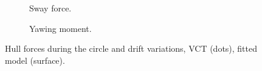 \begin{figure}[h]
     \centering
     \begin{subfigure}[b]{0.49\textwidth}
         \centering
         
        \caption{Sway force.}
        \label{fig:circle_drift_Y_H_optiwise}
     \end{subfigure}
     \hfill
     \begin{subfigure}[b]{0.49\textwidth}
         \centering
         
        \caption{Yawing moment.}
        \label{fig:circle_drift_N_H_optiwise}
     \end{subfigure}
    \caption{Hull forces during the circle and drift variations, VCT (dots), fitted model (surface).}
    \label{fig:circle_drift_optiwise}
\end{figure}

